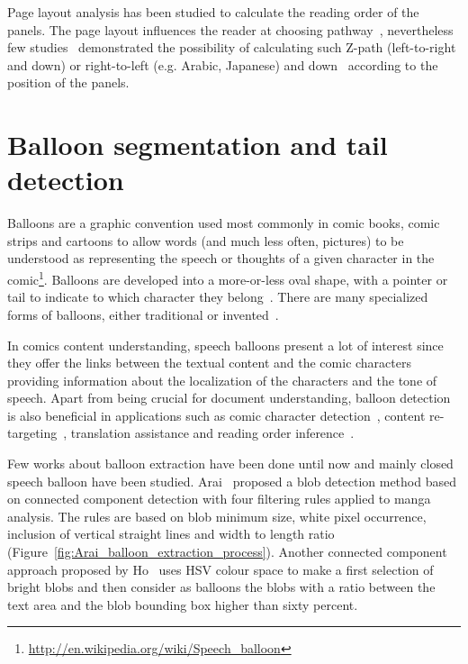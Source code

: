 Page layout analysis has been studied to calculate the reading order of the panels.
The page layout influences the reader at choosing pathway~\cite{Cohn_2013}, nevertheless few studies~\cite{Guerin2012Ontologies,Ponsard09,Arai2010Automatic} demonstrated the possibility of calculating such Z-path (left-to-right and down) or right-to-left (e.g. Arabic, Japanese) and down~\cite{Li2013Comic,Tsai2013Adaptive} according to the position of the panels. 

\section{Balloon segmentation and tail detection}
\label{sec:sota:balloon_segmentation}

Balloons are a graphic convention used most commonly in comic books, comic strips and cartoons to allow words (and much less often, pictures) to be understood as representing the speech or thoughts of a given character in the comic\footnote{\url{http://en.wikipedia.org/wiki/Speech_balloon}}.
Balloons are developed into a more-or-less oval shape, with a pointer or tail to indicate to which character they belong~\cite{Goggin2010Rise,Varnum2007Language}.
There are many specialized forms of balloons, either traditional or invented~\cite{Marx2006Writing}.

In comics content understanding, speech balloons present a lot of interest since they offer the links between the textual content and the comic characters providing information about the localization of the characters and the tone of speech.
Apart from being crucial for document understanding, balloon detection is also beneficial in applications such as comic character detection~\cite{Sun2011}, content re-targeting~\cite{Matsui2011}, translation assistance and reading order inference~\cite{Guerin2012Ontologies}.

Few works about balloon extraction have been done until now and mainly closed speech balloon have been studied.
Arai~\cite{Arai11} proposed a blob detection method based on connected component detection with four filtering rules applied to manga analysis.
The rules are based on blob minimum size, white pixel occurrence, inclusion of vertical straight lines and width to length ratio (Figure~\ref{fig:Arai_balloon_extraction_process}).
Another connected component approach proposed by Ho~\cite{Ho2012} uses HSV colour space to make a first selection of bright blobs and then consider as balloons the blobs with a ratio between the text area and the blob bounding box higher than sixty percent.


